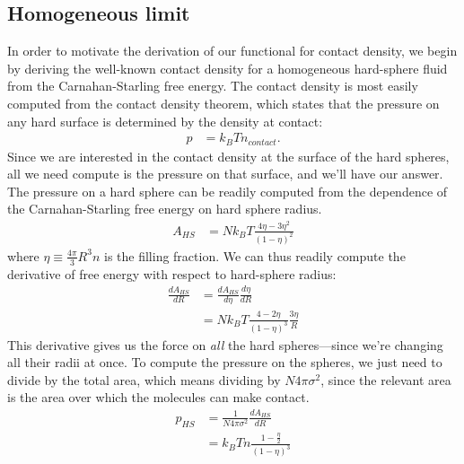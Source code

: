 \documentclass[letterpaper,twocolumn,amsmath,amssymb,jcp,10pt,aip]{revtex4-1}
\newcommand{\derivation}[1]{} %
\begin{document}
\subsection{Homogeneous limit}

In order to motivate the derivation of our functional for contact
density, we begin by deriving the well-known contact density for a
homogeneous hard-sphere fluid from the Carnahan-Starling free energy.
The contact density is most easily computed from the contact density
theorem, which states that the pressure on any hard surface is
determined by the density at contact:
\begin{align}
  p &= k_BT n_\textit{contact}.
\end{align}
Since we are interested in the contact density at the surface of the
hard spheres, all we need compute is the pressure on that surface, and
we'll have our answer.  The pressure on a hard sphere can be readily
computed from the dependence of the Carnahan-Starling free energy on
hard sphere radius.
\begin{align}
  A_{HS} &= Nk_BT \frac{4\eta - 3\eta^2}{(1-\eta)^2}
\end{align}
where $\eta \equiv \frac{4\pi}{3} R^3 n$ is the filling fraction.  We
can thus readily compute the derivative of free energy with respect to
hard-sphere radius:
\begin{align}
  \frac{dA_{HS}}{dR} &= \frac{dA_{HS}}{d\eta} \frac{d\eta}{dR} \\
  \derivation{
    &= Nk_BT \left( \frac{4 - 6\eta}{(1-\eta)^2} + 2 \frac{4\eta - 3\eta^2}{(1-\eta)^3} \right) \frac{d\eta}{dR}
    \\
    &= Nk_BT \frac{4 - 4\eta - 6\eta + 6\eta^2 + 8\eta - 6\eta^2}{(1-\eta)^3} \frac{d\eta}{dR}
    \\
    &= Nk_BT \frac{4 - 2\eta}{(1-\eta)^3} \frac{d\eta}{dR}
    \\
  }
  &= Nk_BT \frac{4 - 2\eta}{(1-\eta)^3} \frac{3 \eta}{R} \label{eq:dAhsdR}
\end{align}
This derivative gives us the force on \emph{all} the hard
spheres---since we're changing all their radii at once.  To compute
the pressure on the spheres, we just need to divide by the total area,
which means dividing by $N 4\pi \sigma^2$, since the relevant area
is the area over which the molecules can make contact.
\begin{align}
  p_{HS} &= \frac{1}{N 4\pi \sigma^2} \frac{dA_{HS}}{dR} \\
  \derivation{
    &= \frac14 \frac{1}{N 4\pi R^2} Nk_BT \frac{4 - 2\eta}{(1-\eta)^3} \frac{3 \eta}{R} \\
    &= \frac{3}{4\pi R^3} \eta k_BT \frac{1 -
      \frac{\eta}2}{(1-\eta)^3} \\
  }
  &= k_BT n \frac{1 - \frac{\eta}2}{(1-\eta)^3}
\end{align}
\end{document}
